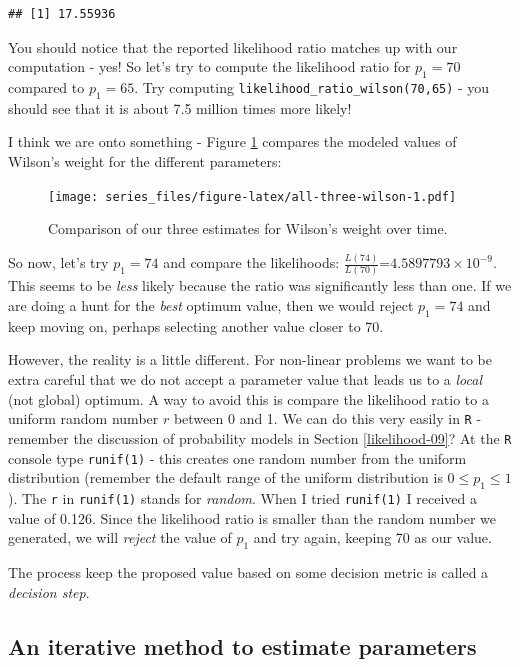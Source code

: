 \documentclass[
]{book}
\theoremstyle{definition}
\theoremstyle{definition}
\theoremstyle{definition}
\theoremstyle{remark}
\begin{document}
\begin{verbatim}
## [1] 17.55936
\end{verbatim}

You should notice that the reported likelihood ratio matches up with our computation - yes! So let's try to compute the likelihood ratio for \(p_{1}=70\) compared to \(p_{1}=65\). Try computing \texttt{likelihood\_ratio\_wilson(70,65)} - you should see that it is about 7.5 million times more likely!

I think we are onto something - Figure \ref{fig:all-three-wilson} compares the modeled values of Wilson's weight for the different parameters:

\begin{figure}
\centering
\texttt{[image: series\_files/figure-latex/all-three-wilson-1.pdf]}
\caption{\label{fig:all-three-wilson}Comparison of our three estimates for Wilson's weight over time.}
\end{figure}

So now, let's try \(p_{1}=74\) and compare the likelihoods: \(\displaystyle \frac{ L(74) }{ L(70) }\)=\ensuremath{4.5897793\times 10^{-9}}. This seems to be \emph{less} likely because the ratio was significantly less than one. If we are doing a hunt for the \emph{best} optimum value, then we would reject \(p_{1}=74\) and keep moving on, perhaps selecting another value closer to 70.

However, the reality is a little different. For non-linear problems we want to be extra careful that we do not accept a parameter value that leads us to a \emph{local} (not global) optimum. A way to avoid this is compare the likelihood ratio to a uniform random number \(r\) between 0 and 1. We can do this very easily in \texttt{R} - remember the discussion of probability models in Section \ref{likelihood-09}? At the \texttt{R} console type \texttt{runif(1)} - this creates one random number from the uniform distribution (remember the default range of the uniform distribution is \(0 \leq p_{1} \leq 1\)). The \texttt{r} in \texttt{runif(1)} stands for \emph{random}. When I tried \texttt{runif(1)} I received a value of 0.126. Since the likelihood ratio is smaller than the random number we generated, we will \emph{reject} the value of \(p_{1}\) and try again, keeping 70 as our value.

The process keep the proposed value based on some decision metric is called a \emph{decision step}.

\hypertarget{an-iterative-method-to-estimate-parameters}{%
\subsection{An iterative method to estimate parameters}\label{an-iterative-method-to-estimate-parameters}}
\end{document}
